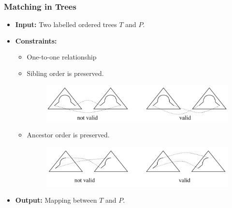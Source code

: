\documentclass{beamer}
\begin{document}
\begin{frame}
\frametitle{Matching in Trees}
\begin{itemize}
\item \textbf{Input:}
Two labelled ordered trees $T$ and $P$.
\item \textbf{Constraints: }
\begin{itemize}
\item One-to-one relationship
\item Sibling order is preserved.
\begin{figure}
	\includegraphics[width=1.0\linewidth]{SiblingOrderPreserved}
	\label{Sibling Order is Preserved} 
	\centering
\end{figure}
\item Ancestor order is preserved.
\begin{figure}
	\includegraphics[width=1.0\linewidth]{AncestorOrderPreserved}
	\label{Ancestor Order is Preserved} 
	\centering
\end{figure}
\end{itemize}
\item \textbf{Output:}
Mapping between $T$ and $P$. 
\end{itemize}
\end{frame}	
\end{document}
